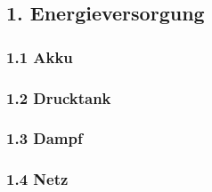 \subsection{1. Energieversorgung}

\subsubsection{1.1 Akku}

\subsubsection{1.2 Drucktank}

\subsubsection{1.3 Dampf}

\subsubsection{1.4 Netz}